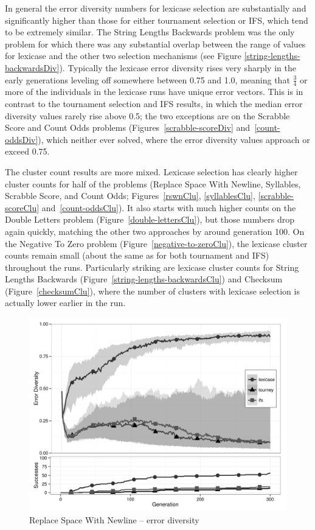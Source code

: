 In general the error diversity numbers for lexicase selection are substantially and significantly
higher than those for either tournament selection or IFS, which tend to be extremely similar.
The String Lengths Backwards problem was the only problem for which there was any substantial overlap 
between the range of values for lexicase and the other two selection mechanisms (see 
Figure \ref{string-lengths-backwardsDiv}). Typically the lexicase error diversity rises very sharply
in the early generations leveling off somewhere between 0.75 and 1.0, meaning that $\frac{3}{4}$ or
more of the individuals in the lexicase runs have unique error vectors. This is in contrast
to the tournament selection and IFS results, in which the median error diversity values rarely rise above
0.5; the two exceptions are on the Scrabble Score and Count Odds problems 
(Figures~\ref{scrabble-scoreDiv} and~\ref{count-oddsDiv}), which neither ever
solved, where the error diversity values approach or exceed 0.75.

The cluster count results are more mixed. Lexicase selection has clearly higher cluster counts for
half of the problems (Replace Space With Newline, Syllables, Scrabble Score, and Count Odds;
Figures~\ref{rswnClu}, \ref{syllablesClu}, \ref{scrabble-scoreClu} and~\ref{count-oddsClu}).
It also starts with much higher counts on the Double Letters problem (Figure~\ref{double-lettersClu}), 
but those numbers drop again quickly, matching the other two approaches by around generation 100. 
On the Negative To Zero problem (Figure~\ref{negative-to-zeroClu}), the lexicase
cluster counts remain small (about the same as for both tournament and IFS) throughout the runs.
Particularly striking are lexicase cluster counts for String Lengths Backwards (Figure~\ref{string-lengths-backwardsClu}) and Checksum (Figure~\ref{checksumClu}), where the
number of clusters with lexicase selection is actually lower earlier in the run.

\begin{figure}[p] %
\centering
\includegraphics[width=11.5cm]{replace-space-with-newline-diversity.pdf}
\caption{Replace Space With Newline -- error diversity}
\label{rswnDiv}
\end{figure}

